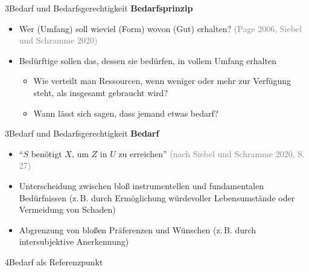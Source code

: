 \documentclass[xcolor=table,9pt,aspectratio=169]{beamer}
\begin{document}
\begin{frame}{\vspace*{10mm}3\hspace*{1em}Bedarf und Bedarfsgerechtigkeit}
\textbf{Bedarfsprinzip}\\
\medskip
\begin{itemize}
   \item Wer (Umfang) soll wieviel (Form) wovon (Gut) erhalten? \textcolor{gray}{(Page 2006, Siebel und Schramme 2020)}
   \item Bedürftige sollen das, dessen sie bedürfen, in vollem Umfang erhalten
   \begin{itemize}
      \item Wie verteilt man Ressourcen, wenn weniger oder mehr zur Verfügung steht, als insgesamt gebraucht wird?
      \item Wann lässt sich sagen, dass jemand etwas bedarf?
   \end{itemize}
\end{itemize}
\end{frame}


\begin{frame}{\vspace*{10mm}3\hspace*{1em}Bedarf und Bedarfsgerechtigkeit}
\textbf{Bedarf}\\
\medskip
\begin{itemize}
   \item \enquote{$S$ benötigt $X$, um $Z$ in $U$ zu erreichen} \textcolor{gray}{(nach Siebel und Schramme 2020, S. 27)}
   \item Unterscheidung zwischen bloß instrumentellen und fundamentalen Bedürfnissen (z.\,B. durch Ermöglichung würdevoller Lebensumstände oder Vermeidung von Schaden)
   \item Abgrenzung von bloßen Präferenzen und Wünschen (z.\,B. durch intersubjektive Anerkennung)
\end{itemize}
\end{frame}


\begin{frame}
\begin{overlayarea}{\textwidth}{0.81\paperheight}{
   \vspace*{11mm}
   \textcolor{uolblue}
   {4\hspace*{1em}Bedarf als Referenzpunkt}
}
\end{overlayarea}
\end{frame}
\end{document}
